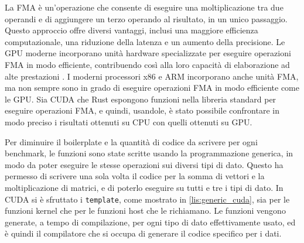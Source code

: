 La FMA è un'operazione che consente di eseguire una moltiplicazione tra due operandi e di aggiungere un terzo operando al risultato, in un unico passaggio. Questo approccio offre diversi vantaggi, inclusi una maggiore efficienza computazionale, una riduzione della latenza e un aumento della precisione. Le GPU moderne incorporano unità hardware specializzate per eseguire operazioni FMA in modo efficiente, contribuendo così alla loro capacità di elaborazione ad alte prestazioni \cite[]{NVIDIA:fma}. I moderni processori x86 e ARM incorporano anche unità FMA, ma non sempre sono in grado di eseguire operazioni FMA in modo efficiente come le GPU. Sia CUDA che Rust espongono funzioni nella libreria standard per eseguire operazioni FMA, e quindi, usandole, è stato possibile confrontare in modo preciso i risultati ottenuti su CPU con quelli ottenuti su GPU.


Per diminuire il boilerplate e la quantità di codice da scrivere per ogni benchmark, le funzioni sono state scritte usando la programmazione generica, in modo da poter eseguire le stesse operazioni sui diversi tipi di dato. Questo ha permesso di scrivere una sola volta il codice per la somma di vettori e la moltiplicazione di matrici, e di poterlo eseguire su tutti e tre i tipi di dato. In CUDA si è sfruttato i \verb|template|, come mostrato in \ref{lis:generic_cuda}, sia per le funzioni kernel che per le funzioni host che le richiamano. Le funzioni vengono generate, a tempo di compilazione, per ogni tipo di dato effettivamente usato, ed è quindi il compilatore che si occupa di generare il codice specifico per i dati. 

